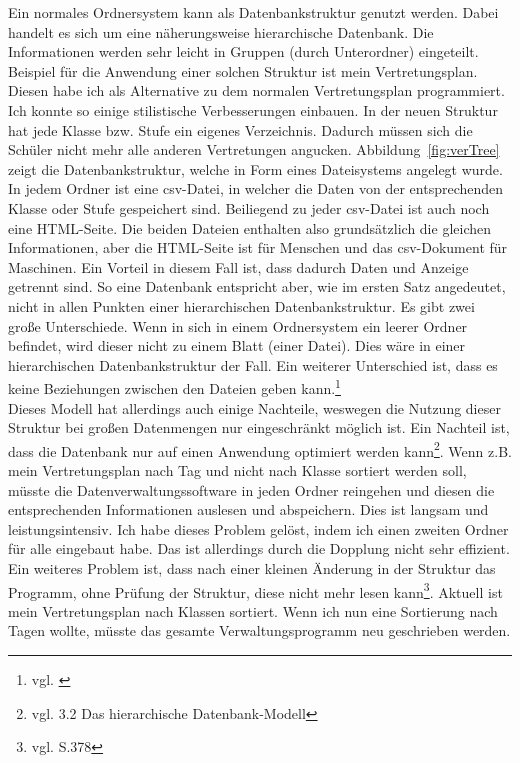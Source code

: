 \documentclass[a4paper, 12pt]{article}
\theoremstyle{plain}
\theoremstyle{definition}
\begin{document}
	Ein normales Ordnersystem kann als Datenbankstruktur genutzt werden. Dabei handelt es sich um eine näherungsweise hierarchische Datenbank. Die Informationen werden sehr leicht in Gruppen (durch Unterordner) eingeteilt. Beispiel für die Anwendung einer solchen Struktur ist mein Vertretungsplan. Diesen habe ich als Alternative zu dem normalen Vertretungsplan programmiert. Ich konnte so einige stilistische Verbesserungen einbauen. In der neuen Struktur hat jede Klasse bzw. Stufe ein eigenes Verzeichnis. Dadurch müssen sich die Schüler nicht mehr alle anderen Vertretungen angucken.  Abbildung~\ref{fig:verTree} zeigt die Datenbankstruktur, welche in Form eines Dateisystems angelegt wurde. In jedem Ordner ist eine csv-Datei, in welcher die Daten von der entsprechenden Klasse oder Stufe gespeichert sind. Beiliegend zu jeder csv-Datei ist auch noch eine HTML-Seite. Die beiden Dateien enthalten also grundsätzlich die gleichen Informationen, aber die HTML-Seite ist für Menschen und das csv-Dokument für Maschinen. Ein Vorteil in diesem Fall ist, dass dadurch Daten und Anzeige getrennt sind. So eine Datenbank entspricht aber, wie im ersten Satz angedeutet, nicht in allen Punkten einer hierarchischen Datenbankstruktur. Es gibt zwei große Unterschiede. Wenn in sich in einem Ordnersystem ein leerer Ordner befindet, wird dieser nicht zu einem Blatt (einer Datei). Dies wäre in einer hierarchischen Datenbankstruktur der Fall. Ein weiterer Unterschied ist, dass es keine Beziehungen zwischen den Dateien geben kann.\footnote{vgl. \cite{hierDbWiki}}\\
Dieses Modell hat allerdings auch einige Nachteile, weswegen die Nutzung dieser Struktur bei großen Datenmengen nur eingeschränkt möglich ist. Ein Nachteil ist, dass die Datenbank nur auf einen Anwendung optimiert werden kann\footnote{vgl. \cite{Jarosch2010} 3.2 Das hierarchische Datenbank-Modell}. Wenn z.B. mein Vertretungsplan nach Tag und nicht nach Klasse sortiert werden soll, müsste die Datenverwaltungssoftware in jeden Ordner reingehen und diesen die entsprechenden Informationen auslesen und abspeichern. Dies ist langsam und leistungsintensiv. Ich habe dieses Problem gelöst, indem ich einen zweiten Ordner für alle eingebaut habe. Das ist allerdings durch die Dopplung nicht sehr effizient. \\
Ein weiteres Problem ist, dass nach einer kleinen Änderung in der Struktur das Programm, ohne Prüfung der Struktur, diese nicht mehr lesen kann\footnote{vgl. \cite{Codd1970} S.378}. Aktuell ist mein Vertretungsplan nach Klassen sortiert. Wenn ich nun eine Sortierung nach Tagen wollte, müsste das gesamte Verwaltungsprogramm neu geschrieben werden.
	
\end{document}

